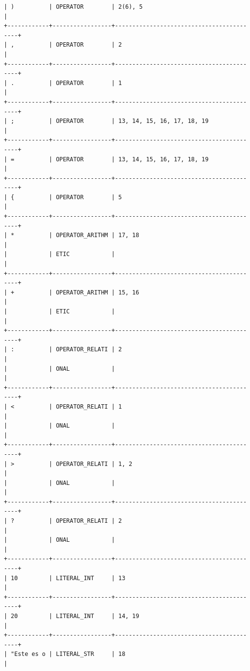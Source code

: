 \documentclass[a4paper,12pt]{article}
\begin{document}
\begin{flushleft}
\begin{verbatim}
| )          | OPERATOR        | 2(6), 5                                  |
+------------+-----------------+------------------------------------------+
| ,          | OPERATOR        | 2                                        |
+------------+-----------------+------------------------------------------+
| .          | OPERATOR        | 1                                        |
+------------+-----------------+------------------------------------------+
| ;          | OPERATOR        | 13, 14, 15, 16, 17, 18, 19               |
+------------+-----------------+------------------------------------------+
| =          | OPERATOR        | 13, 14, 15, 16, 17, 18, 19               |
+------------+-----------------+------------------------------------------+
| {          | OPERATOR        | 5                                        |
+------------+-----------------+------------------------------------------+
| *          | OPERATOR_ARITHM | 17, 18                                   |
|            | ETIC            |                                          |
+------------+-----------------+------------------------------------------+
| +          | OPERATOR_ARITHM | 15, 16                                   |
|            | ETIC            |                                          |
+------------+-----------------+------------------------------------------+
| :          | OPERATOR_RELATI | 2                                        |
|            | ONAL            |                                          |
+------------+-----------------+------------------------------------------+
| <          | OPERATOR_RELATI | 1                                        |
|            | ONAL            |                                          |
+------------+-----------------+------------------------------------------+
| >          | OPERATOR_RELATI | 1, 2                                     |
|            | ONAL            |                                          |
+------------+-----------------+------------------------------------------+
| ?          | OPERATOR_RELATI | 2                                        |
|            | ONAL            |                                          |
+------------+-----------------+------------------------------------------+
| 10         | LITERAL_INT     | 13                                       |
+------------+-----------------+------------------------------------------+
| 20         | LITERAL_INT     | 14, 19                                   |
+------------+-----------------+------------------------------------------+
| "Este es o | LITERAL_STR     | 18                                       |

\end{verbatim}
\end{flushleft}
\end{document}
